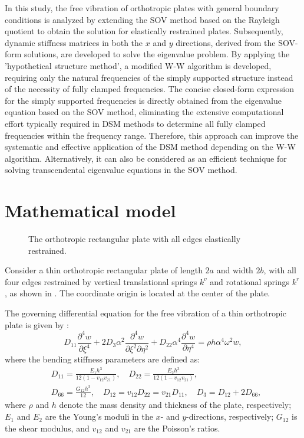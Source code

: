 \documentclass[preprint,12pt]{elsarticle}
\begin{document}
In this study, the free vibration of orthotropic plates with general boundary conditions is analyzed by extending the SOV method based on the Rayleigh quotient to obtain the solution for elastically restrained plates.
Subsequently, dynamic stiffness matrices in both the \(x\) and \(y\) directions, derived from the SOV-form solutions, are developed to solve the eigenvalue problem.
By applying the 'hypothetical structure method', a modified W-W algorithm is developed, requiring only the natural frequencies of the simply supported structure instead of the necessity of fully clamped frequencies.
The concise closed-form expression for the simply supported frequencies is directly obtained from the eigenvalue equation based on the SOV method, eliminating the extensive computational effort typically required in DSM methods to determine all fully clamped frequencies within the frequency range.  
Therefore, this approach can improve the systematic and effective application of the DSM method depending on the W-W algorithm.
Alternatively, it can also be considered as an efficient technique for solving transcendental eigenvalue equations in the SOV method.

\FloatBarrier
\section{Mathematical model}\label{sec:Mathematical model}
\begin{figure}[!htbp]
	\centering
	\resizebox{0.8\textwidth}{!}
	{
		
	}
	\caption{\small The orthotropic rectangular plate with all edges elastically restrained.} 
	\label{fig:platemode}
\end{figure}
Consider a thin orthotropic rectangular plate of length \(2a\) and width \(2b\), with all four edges restrained by vertical translational springs \(k^v\) and rotational springs \(k^r\), as shown in . 
The coordinate origin is located at the center of the plate.

The governing differential equation for the free vibration of a thin orthotropic plate is given by \citep{xing2020improved}:  
%
\begin{equation}\label{eq:governing_EOM}
	D_{11}\frac{\partial^4w}{\partial \xi^4} + 2D_3\alpha^2\frac{\partial^4w}{\partial \xi^2 \partial \eta^2} + D_{22}\alpha^4\frac{\partial^4w}{\partial \eta^4} = \rho h\alpha^4\omega^2w,
\end{equation}
%
where the bending stiffness parameters are defined as:
%
\begin{equation}\label{eq:bd_stiff}
	\begin{split}
		&D_{11} = \frac{E_1h^3}{12(1-v_{12}v_{21})}, \quad D_{22} = \frac{E_2h^3}{12(1-v_{12}v_{21})}, \\  
		&D_{66} = \frac{G_{12}h^3}{12}, \quad D_{12} = v_{12}D_{22} = v_{21}D_{11}, \quad D_3 = D_{12} + 2D_{66},
	\end{split}
\end{equation}
%
where \(\rho\) and \(h\) denote the mass density and thickness of the plate, respectively; \(E_1\) and \(E_2\) are the Young’s moduli in the \(x\)- and \(y\)-directions, respectively; \(G_{12}\) is the shear modulus, and \(v_{12}\) and \(v_{21}\) are the Poisson’s ratios.
\end{document}
